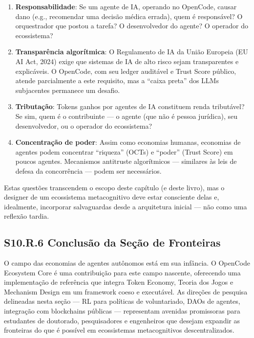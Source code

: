 \begin{enumerate}
    \item \textbf{Responsabilidade}: Se um agente de IA, operando no OpenCode, causar dano (e.g., recomendar uma decisão médica errada), quem é responsável? O orquestrador que postou a tarefa? O desenvolvedor do agente? O operador do ecossistema?
    
    \item \textbf{Transparência algorítmica}: O Regulamento de IA da União Europeia (EU AI Act, 2024) exige que sistemas de IA de alto risco sejam transparentes e explicáveis. O OpenCode, com seu ledger auditável e Trust Score público, atende parcialmente a este requisito, mas a ``caixa preta'' dos LLMs subjacentes permanece um desafio.
    
    \item \textbf{Tributação}: Tokens ganhos por agentes de IA constituem renda tributável? Se sim, quem é o contribuinte --- o agente (que não é pessoa jurídica), seu desenvolvedor, ou o operador do ecossistema?
    
    \item \textbf{Concentração de poder}: Assim como economias humanas, economias de agentes podem concentrar ``riqueza'' (OCTs) e ``poder'' (Trust Score) em poucos agentes. Mecanismos antitruste algorítmicos --- similares às leis de defesa da concorrência --- podem ser necessários.
\end{enumerate}

Estas questões transcendem o escopo deste capítulo (e deste livro), mas o designer de um ecossistema metacognitivo deve estar consciente delas e, idealmente, incorporar salvaguardas desde a arquitetura inicial --- não como uma reflexão tardia.

\subsection*{S10.R.6 Conclusão da Seção de Fronteiras}

O campo das economias de agentes autônomos está em sua infância. O OpenCode Ecosystem Core é uma contribuição para este campo nascente, oferecendo uma implementação de referência que integra Token Economy, Teoria dos Jogos e Mechanism Design em um framework coeso e executável. As direções de pesquisa delineadas nesta seção --- RL para políticas de voluntariado, DAOs de agentes, integração com blockchains públicas --- representam avenidas promissoras para estudantes de doutorado, pesquisadores e engenheiros que desejam expandir as fronteiras do que é possível em ecossistemas metacognitivos descentralizados.

